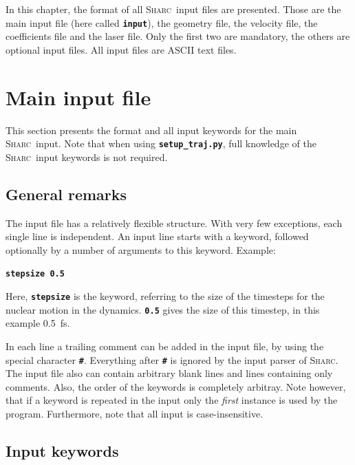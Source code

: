 \documentclass[a4paper,11pt,DIV=15,openany,twoside=false]{scrbook}
\newcommand{\sharc}{\textsc{Sharc}}
\newcommand{\ttt}[1]{\textbf{\texttt{#1}}}
\newenvironment{example}{
  \vspace{0mm}
  \definecolor{shadecolor}{HTML}{BBDDFF}
  \begin{shaded}
  \begin{minipage}{0.9\textwidth}
}{
  \end{minipage}
  \end{shaded}
}
\begin{document}
In this chapter, the format of all \sharc\ input files are presented. Those are the main input file (here called \ttt{input}), the geometry file, the velocity file, the coefficients file and the laser file. Only the first two are mandatory, the others are optional input files. All input files are ASCII text files.


\section{Main input file}\label{sec:inputfile}

This section presents the format and all input keywords for the main \sharc\ input. Note that when using \ttt{setup\_traj.py}, full knowledge of the \sharc\ input keywords is not required.

\subsection{General remarks}

The input file has a relatively flexible structure. With very few exceptions, each single line is independent. An input line starts with a keyword, followed optionally by a number of arguments to this keyword. Example:

\begin{example}
  \ttt{stepsize 0.5}
\end{example}

Here, \ttt{stepsize} is the keyword, referring to the size of the timesteps for the nuclear motion in the dynamics. \ttt{0.5} gives the size of this timestep, in this example 0.5~fs.

In each line a trailing comment can be added in the input file, by using the special character \ttt{\#}. Everything after \ttt{\#} is ignored by the input parser of \sharc. The input file also can contain arbitrary blank lines and lines containing only comments. Also, the order of the keywords is completely arbitray. Note however, that if a keyword is repeated in the input only the \textit{first} instance is used by the program. Furthermore, note that all input is case-insensitive.

\subsection{Input keywords}
\end{document}
